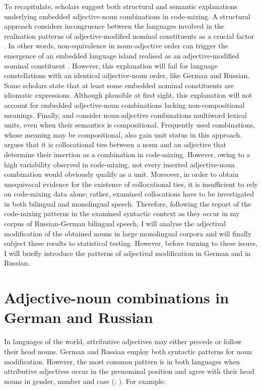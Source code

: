 To recapitulate, scholars suggest both structural and semantic explanations underlying embedded adjective-noun combinations in code-mixing. A structural approach considers incongruence between the languages involved in the realisation patterns of adjective-modified nominal constituents as a crucial factor \citep{myers-scotton-matching-1995, myers-scotton-contact-2002}. In other words, non-equivalence in noun-adjective order can trigger the emergence of an embedded language island realised as an adjective-modified nominal constituent \citep{deuchar-congruence-2005}. However, this explanation will fail for language constellations with an identical adjective-noun order, like German and Russian. Some scholars \citep[e.g.,][]{poplack-meechan-1995} state that at least some embedded nominal constituents are idiomatic expressions. Although plausible at first sight, this explanation will not account for embedded adjective-noun combinations lacking non-compositional meanings. Finally, \citet[][]{backus-two-1996} and \citet[][]{boumans-syntax-1998} consider noun-adjective combinations multiword lexical units, even when their semantics is compositional. Frequently used combinations, whose meaning may be compositional, also gain unit status in this approach. \citet{boumans-syntax-1998} argues that it is collocational ties between a noun and an adjective that determine their insertion as a combination in code-mixing.  However, owing to a high variability observed in code-mixing, not every inserted adjective-noun combination would obviously qualify as a unit. Moreover, in order to obtain unequivocal evidence for the existence of collocational ties, it is insufficient to rely on code-mixing data alone; rather, examined collocations have to be investigated in both bilingual and monolingual speech. Therefore, following the report of the code-mixing patterns in the examined syntactic context as they occur in my corpus of Russian-German bilingual speech, I will analyse the adjectival modification of the obtained nouns in large monolingual corpora and will finally subject these results to statistical testing. However, before turning to these issues, I will briefly introduce the patterns of adjectival modification in German and in Russian.

\section{Adjective-noun combinations in German and Russian}\label{sec:AN}
In languages of the world, attributive adjectives may either precede or follow their head nouns. German and Russian employ both syntactic patterns for noun modification. However, the most common pattern is in both languages when attributive adjectives occur in the prenominal position and agree with their head nouns in gender, number and case (\citealt[1303]{rusgramm-tom1}; \citealt[232]{eisenberg-satz-1999}). For example:

